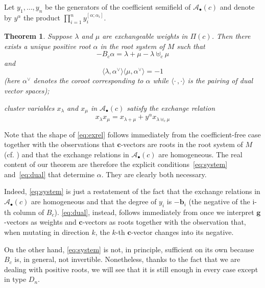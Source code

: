 \documentclass[11pt]{amsart}
\newcommand{\cA}{\mathcal{A}}
\newcommand{\bg}{\mathbf{g}}
\newcommand{\bc}{\mathbf{c}}
\newcommand{\bb}{\mathbf{b}}
\newcommand{\A}{{M}}
\newtheorem{theorem}{Theorem}[section]
\theoremstyle{definition}
\numberwithin{equation}{section}
\numberwithin{figure}{section}
\begin{document}
  Let $y_1,\dots,y_n$ be the generators of the coefficient semifield of $\cA_\bullet(c)$ and denote by $y^\alpha$ the product $\prod_{i=1}^n y_i^{[\alpha;\alpha_i]}$.


 \begin{theorem}
    \label{thm:main} \say[PT]{}
    Suppose $\lambda$ and $\mu$ are exchangeable weights in $\Pi(c)$. 
    Then there exists a unique  positive root  $\alpha$ in the root system of $\A$ such that
    \begin{equation}
      \label{eq:system}
      -B_c\alpha = \lambda+\mu-\lambda\uplus_c\mu
    \end{equation}
    and
    \begin{equation}
      \label{eq:dual}
      \langle\lambda,\alpha^\vee\rangle 
      \langle\mu,\alpha^\vee\rangle 
      = -1
    \end{equation}
    (here $\alpha^\vee$ denotes the \emph{coroot} corresponding to $\alpha$ while $\langle\cdot\,,\cdot\rangle$ is the pairing of dual vector spaces);

cluster variables $x_\lambda$ and $x_\mu$ in $\cA_\bullet(c)$ satisfy the exchange relation
    \begin{equation}
      \label{eq:exrel}
      x_\lambda x_\mu = x_{\lambda+\mu} + y^\alpha x_{\lambda\uplus_c\mu}
    \end{equation}
   \end{theorem}




  Note that the shape of \cref{eq:exrel} follows immediately from the coefficient-free case \cite[Proposition 5.2]{Ste13} together with the observations that $\bc$-vectors are roots in the root system of $\A$ (cf. \cite{NS14})  and that the exchange relations in $\cA_\bullet(c)$ are homogeneous.
  The real content of our theorem are therefore the explicit conditions~\cref{eq:system} and~\cref{eq:dual} that determine $\alpha$. 
  They are clearly both necessary.

  Indeed, \cref{eq:system} is just a restatement of the fact that the exchange relations in $\cA_\bullet(c)$ are homogeneous and that the degree of $y_i$ is $-\bb_i$ (the negative of the i-th column of $B_c$).
  \cref{eq:dual}, instead, follows immediately from \cite[Eq. (1.11)]{NZ12} once we interpret $\bg$-vectors as weights and $\bc$-vectors as roots together with the observation that, when mutating in direction $k$, the $k$-th $\bc$-vector changes into its negative.
  
  On the other hand, \cref{eq:system} is not, in principle, sufficient on its own because $B_c$ is, in general, not invertible.
  Nonetheless, thanks to the fact that we are dealing with positive roots, we will see that it is still enough in every case except in type $D_n$.
  
\end{document}
